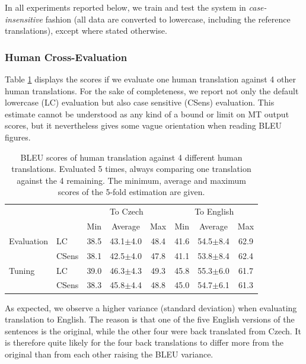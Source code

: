 \documentclass[10pt]{report}
\theoremstyle{plain}
\begin{document}
{{In all experiments reported below, we train and test the system in
\emph{case-insensitive} fashion (all data are converted to lowercase, including
the reference translations), except where stated otherwise.



\subsubsection{Human Cross-Evaluation}

Table \ref{crosseval} displays the scores if we evaluate one human translation
against 4 other human translations. For the sake of completeness, we report not
only the default lowercase (LC) evaluation but also case sensitive (CSens)
evaluation. This estimate cannot be understood as any kind of a bound or limit
on MT output scores, but it nevertheless gives some vague orientation when
reading BLEU figures.

\begin{table}[ht]
\begin{center}
\begin{tabular}{llccc|ccc}
   &     &  \multicolumn{3}{c}{To Czech}   &  \multicolumn{3}{c}{To English}\\
  &    &  Min  &  Average  &  Max  &  Min  &  Average  &  Max\\
\hline
Evaluation   &  LC   &  38.5  &  43.1$\pm$4.0  &  48.4   &  41.6  &  54.5$\pm$8.4  &  62.9\\
   &  CSens  &  38.1  &  42.5$\pm$4.0  &  47.8   &  41.1  &  53.8$\pm$8.4  &  62.4\\
\hline
Tuning   &  LC   &  39.0  &  46.3$\pm$4.3  &  49.3   &  45.8  &  55.3$\pm$6.0  &  61.7\\
   &  CSens  &  38.3  &  45.8$\pm$4.4  &  48.8   &  45.0  &  54.7$\pm$6.1  &  61.3\\
\end{tabular}
\end{center}
\caption{BLEU scores of human translation against 4 different human
translations. Evaluated 5 times, always comparing one translation against the 4
remaining. The minimum, average and maximum scores of the 5-fold estimation are
given.}
\label{crosseval}
\end{table}

As expected, we observe a higher variance (standard deviation) when evaluating
translation to English. The reason is that one of the five English versions of
the sentences is the original, while the other four were back translated
from Czech. It is therefore quite likely for the four back translations to differ
more from the original than from each other raising the BLEU variance.

}}
\end{document}
